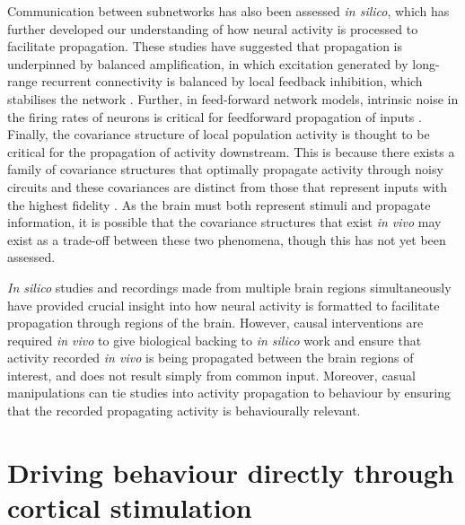 Communication between subnetworks has also been assessed \textit{in silico}, which has further developed our understanding of how neural activity is processed to facilitate propagation. These studies have suggested that propagation is underpinned by balanced amplification, in which excitation generated by long-range recurrent connectivity is balanced by local feedback inhibition, which stabilises the network \cite{joglekar_inter-areal_2018}. Further, in feed-forward network models, intrinsic noise in the firing rates of neurons is critical for feedforward propagation of inputs \cite{vogels_signal_2005, ozer_weak_2010}. Finally, the covariance structure of local population activity is thought to be critical for the propagation of activity downstream. This is because there exists a family of covariance structures that optimally propagate activity through noisy circuits and these covariances are distinct from those that represent inputs with the highest fidelity \cite{zylberberg_robust_2017}. As the brain must both represent stimuli and propagate information, it is possible that the covariance structures that exist \textit{in vivo} may exist as a trade-off between these two phenomena, though this has not yet been assessed.  

\textit{In silico} studies and recordings made from multiple brain regions simultaneously have provided crucial insight into how neural activity is formatted to facilitate propagation through regions of the brain. However, causal interventions are required \textit{in vivo} to give biological backing to \textit{in silico} work and ensure that activity recorded \textit{in vivo} is being propagated between the brain regions of interest, and does not result simply from common input. Moreover, casual manipulations can tie studies into activity propagation to behaviour by ensuring that the recorded propagating activity is behaviourally relevant. 

\section{Driving behaviour directly through cortical stimulation}

